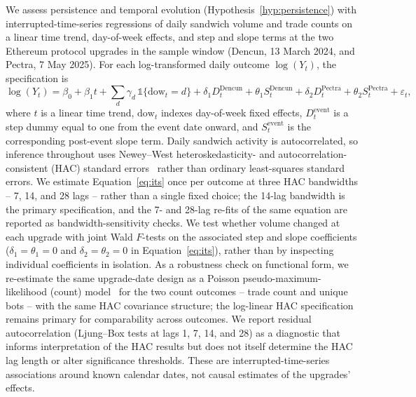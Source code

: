 \documentclass[pdflatex, sn-basic]{sn-jnl}
\theoremstyle{thmstylethree}%
\begin{document}
    We assess persistence and temporal evolution (Hypothesis~\ref{hyp:persistence}) with interrupted-time-series regressions of daily sandwich volume and trade counts on a linear time trend, day-of-week effects, and step and slope terms at the two Ethereum protocol upgrades in the sample window (Dencun, 13 March 2024, and Pectra, 7 May 2025).
    For each log-transformed daily outcome $\log(Y_t)$, the specification is
    \begin{equation}
    \log(Y_t) = \beta_0 + \beta_1 t + \sum_{d} \gamma_d \, \mathbb{1}\{\mathrm{dow}_t = d\} + \delta_1 D^{\text{Dencun}}_t + \theta_1 S^{\text{Dencun}}_t + \delta_2 D^{\text{Pectra}}_t + \theta_2 S^{\text{Pectra}}_t + \varepsilon_t,
    \label{eq:its}
    \end{equation}
    where $t$ is a linear time trend, $\mathrm{dow}_t$ indexes day-of-week fixed effects, $D^{\text{event}}_t$ is a step dummy equal to one from the event date onward, and $S^{\text{event}}_t$ is the corresponding post-event slope term.
    Daily sandwich activity is autocorrelated, so inference throughout uses Newey--West heteroskedasticity- and autocorrelation-consistent (HAC) standard errors~\citep{NeweyWest1987} rather than ordinary least-squares standard errors.
    We estimate Equation~\ref{eq:its} once per outcome at three HAC bandwidths -- 7, 14, and 28 lags -- rather than a single fixed choice; the 14-lag bandwidth is the primary specification, and the 7- and 28-lag re-fits of the same equation are reported as bandwidth-sensitivity checks.
    We test whether volume changed at each upgrade with joint Wald $F$-tests on the associated step and slope coefficients ($\delta_1=\theta_1=0$ and $\delta_2=\theta_2=0$ in Equation~\ref{eq:its}), rather than by inspecting individual coefficients in isolation.
    As a robustness check on functional form, we re-estimate the same upgrade-date design as a Poisson pseudo-maximum-likelihood (count) model~\citep{SantosSilvaTenreyro2006} for the two count outcomes -- trade count and unique bots -- with the same HAC covariance structure; the log-linear HAC specification remains primary for comparability across outcomes.
    We report residual autocorrelation (Ljung--Box tests at lags 1, 7, 14, and 28) as a diagnostic that informs interpretation of the HAC results but does not itself determine the HAC lag length or alter significance thresholds.
    These are interrupted-time-series associations around known calendar dates, not causal estimates of the upgrades' effects.
    
\end{document}
